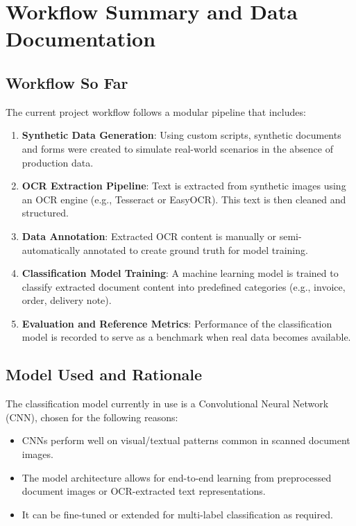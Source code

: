 \section{Workflow Summary and Data Documentation}

\subsection{Workflow So Far}

The current project workflow follows a modular pipeline that includes:

\begin{enumerate}
  \item \textbf{Synthetic Data Generation}: Using custom scripts, synthetic documents and forms were created to simulate real-world scenarios in the absence of production data.
  \item \textbf{OCR Extraction Pipeline}: Text is extracted from synthetic images using an OCR engine (e.g., Tesseract or EasyOCR). This text is then cleaned and structured.
  \item \textbf{Data Annotation}: Extracted OCR content is manually or semi-automatically annotated to create ground truth for model training.
  \item \textbf{Classification Model Training}: A machine learning model is trained to classify extracted document content into predefined categories (e.g., invoice, order, delivery note).
  \item \textbf{Evaluation and Reference Metrics}: Performance of the classification model is recorded to serve as a benchmark when real data becomes available.
\end{enumerate}

\subsection{Model Used and Rationale}

The classification model currently in use is a Convolutional Neural Network (CNN), chosen for the following reasons:

\begin{itemize}
  \item CNNs perform well on visual/textual patterns common in scanned document images.
  \item The model architecture allows for end-to-end learning from preprocessed document images or OCR-extracted text representations.
  \item It can be fine-tuned or extended for multi-label classification as required.
\end{itemize}

